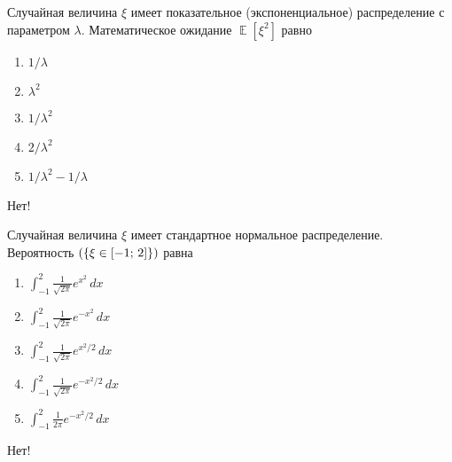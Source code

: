\documentclass[t]{beamer}
\DeclareMathOperator{\E}{\mathbb{E}}
\let\P\relax
\DeclareMathOperator{\P}{\mathbb{P}}
\begin{document}
 \begin{frame} \label{31-No} 
\begin{block}{31} 

Случайная величина $\xi$ имеет показательное (экспоненциальное) распределение с параметром $\lambda$. Математическое ожидание $\E[\xi^2]$ равно
  


 \end{block} 
\begin{enumerate} 
\item[] \hyperlink{31-No}{\beamergotobutton{}  $1/\lambda$ }
\item[] \hyperlink{31-No}{\beamergotobutton{}  $\lambda^2$ }
\item[] \hyperlink{31-No}{\beamergotobutton{}  $1/\lambda^2$ }
\item[] \hyperlink{31-Yes}{\beamergotobutton{}  $2/\lambda^2$ }
\item[] \hyperlink{31-No}{\beamergotobutton{}  $1/\lambda^2 - 1/ \lambda$ }
\end{enumerate} 

 \alert{Нет!} 
\end{frame} 


 \begin{frame} \label{32-No} 
\begin{block}{32} 

Случайная величина $\xi$ имеет стандартное нормальное распределение. Вероятность $\P(\{\xi \in [-1; \, 2]\})$ равна


 \end{block} 
\begin{enumerate} 
\item[] \hyperlink{32-No}{\beamergotobutton{}  $\int_{-1}^{2}\tfrac{1}{\sqrt{2\pi}}e^{x^2}\,dx$ }
\item[] \hyperlink{32-No}{\beamergotobutton{}  $\int_{-1}^{2}\tfrac{1}{\sqrt{2\pi}}e^{-x^2}\,dx$}
\item[] \hyperlink{32-No}{\beamergotobutton{}  $\int_{-1}^{2}\tfrac{1}{\sqrt{2\pi}}e^{x^2 / 2}\,dx$}
\item[] \hyperlink{32-Yes}{\beamergotobutton{}  $\int_{-1}^{2}\tfrac{1}{\sqrt{2\pi}}e^{-x^2 / 2}\,dx$}
\item[] \hyperlink{32-No}{\beamergotobutton{}  $\int_{-1}^{2}\tfrac{1}{2\pi}e^{-x^2 / 2}\,dx$}
\end{enumerate} 

 \alert{Нет!} 
\end{frame} 
\end{document}
